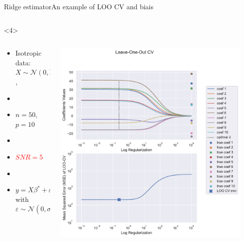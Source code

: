 \documentclass[10pt,aspectratio=43]{beamer}
\begin{document}
\begin{frame}{Ridge estimator}{An example of LOO CV and biais}
\begin{onlyenv}
\begin{columns}
\begin{column}{0.7\textwidth}
\begin{center}
                 \end{center}
            \end{column}
            \end{columns}
    \end{onlyenv}
    \begin{onlyenv}<4>
        \begin{columns}
            \begin{column}{0.4\textwidth}
                \begin{itemize}
                    \item Isotropic data: $X\sim\mathcal{N}(0,\mathrm{Id})$,
                    \item[]
                    \item $n=50$, $p=10$
                    \item[]
                    \item \textcolor{red}{$SNR=5$}
                    \item[]
                    \item $y = X\beta^*+\varepsilon$ with $\varepsilon\sim \mathcal{N}(0, \sigma^2\mathrm{Id})$
                \end{itemize}
            \end{column}
            \begin{column}{0.7\textwidth}
                \begin{center}
                        \includegraphics[width=0.95\textwidth]{path_ridge_complete_5_.pdf}

\end{center}
\end{column}
\end{columns}
\end{onlyenv}
\end{frame}
\end{document}
